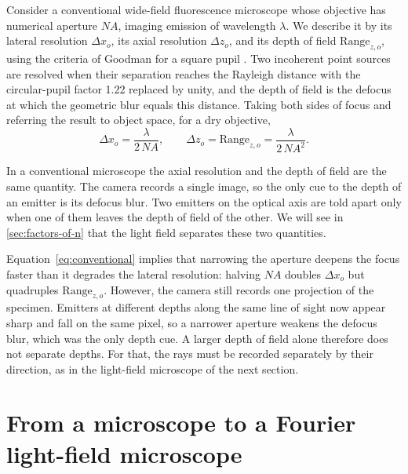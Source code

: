 Consider a conventional wide-field fluorescence microscope whose objective has numerical aperture $NA$, imaging emission of wavelength $\lambda$. We describe it by its lateral resolution $\Delta x_o$, its axial resolution $\Delta z_o$, and its depth of field $\mathrm{Range}_{z,o}$, using the criteria of Goodman for a square pupil \cite[pp.~217--218, 231--233]{goodman2017fourierOptics}. Two incoherent point sources are resolved when their separation reaches the Rayleigh distance with the circular-pupil factor 1.22 replaced by unity, and the depth of field is the defocus at which the geometric blur equals this distance. Taking both sides of focus and referring the result to object space, for a dry objective,
\begin{equation}
    \Delta x_o = \frac{\lambda}{2\,NA}, \qquad
    \Delta z_o = \mathrm{Range}_{z,o} = \frac{\lambda}{2\,NA^2}.
    \label{eq:conventional}
\end{equation}

In a conventional microscope the axial resolution and the depth of field are the same quantity. The camera records a single image, so the only cue to the depth of an emitter is its defocus blur. Two emitters on the optical axis are told apart only when one of them leaves the depth of field of the other. We will see in \cref{sec:factors-of-n} that the light field separates these two quantities.

Equation~\eqref{eq:conventional} implies that narrowing the aperture deepens the focus faster than it degrades the lateral resolution: halving $NA$ doubles $\Delta x_o$ but quadruples $\mathrm{Range}_{z,o}$. However, the camera still records one projection of the specimen. Emitters at different depths along the same line of sight now appear sharp and fall on the same pixel, so a narrower aperture weakens the defocus blur, which was the only depth cue. A larger depth of field alone therefore does not separate depths. For that, the rays must be recorded separately by their direction, as in the light-field microscope of the next section.

\section{From a microscope to a Fourier light-field microscope}
\label{sec:flfm-principle}

